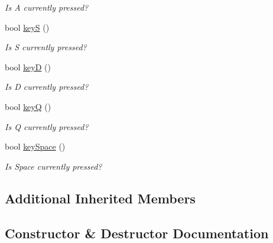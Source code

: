 \begin{DoxyCompactItemize}
\begin{DoxyCompactList}\small\item\em Is A currently pressed? \end{DoxyCompactList}\item 
bool \hyperlink{classbridges_1_1game_1_1_non_blocking_game_a75ece5d4fa35893ecacc82c5064c05e0}{keyS} ()
\begin{DoxyCompactList}\small\item\em Is S currently pressed? \end{DoxyCompactList}\item 
bool \hyperlink{classbridges_1_1game_1_1_non_blocking_game_a932979445cc8acea618092b83b4a9756}{keyD} ()
\begin{DoxyCompactList}\small\item\em Is D currently pressed? \end{DoxyCompactList}\item 
bool \hyperlink{classbridges_1_1game_1_1_non_blocking_game_af0dafefbad315fbfb01851a4a0dfa93e}{keyQ} ()
\begin{DoxyCompactList}\small\item\em Is Q currently pressed? \end{DoxyCompactList}\item 
bool \hyperlink{classbridges_1_1game_1_1_non_blocking_game_a54beca154b58b0e0fb26c75983ba5072}{key\+Space} ()
\begin{DoxyCompactList}\small\item\em Is Space currently pressed? \end{DoxyCompactList}\end{DoxyCompactItemize}
\subsection*{Additional Inherited Members}


\subsection{Constructor \& Destructor Documentation}
\mbox{\label{classbridges_1_1game_1_1_non_blocking_game_a3226aa7e7ff129e916f4bd5aabcb2e72}} 
